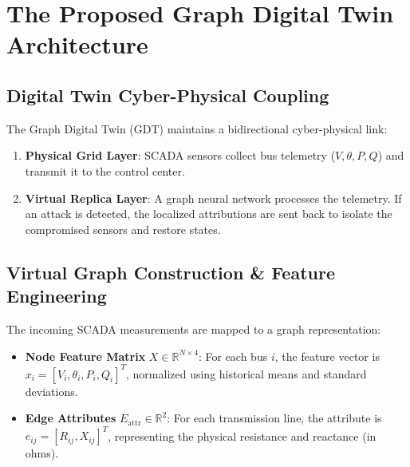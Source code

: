 \documentclass[conference]{IEEEtran}
\begin{document}
\section{The Proposed Graph Digital Twin Architecture}

\subsection{Digital Twin Cyber-Physical Coupling}
The Graph Digital Twin (GDT) maintains a bidirectional cyber-physical link:
\begin{enumerate}
    \item \textbf{Physical Grid Layer}: SCADA sensors collect bus telemetry ($V, \theta, P, Q$) and transmit it to the control center.
    \item \textbf{Virtual Replica Layer}: A graph neural network processes the telemetry. If an attack is detected, the localized attributions are sent back to isolate the compromised sensors and restore states.
\end{enumerate}

\subsection{Virtual Graph Construction & Feature Engineering}
The incoming SCADA measurements are mapped to a graph representation:
\begin{itemize}
    \item \textbf{Node Feature Matrix} $X \in \mathbb{R}^{N \times 4}$: For each bus $i$, the feature vector is $x_i = [V_i, \theta_i, P_i, Q_i]^T$, normalized using historical means and standard deviations.
    \item \textbf{Edge Attributes} $E_{\text{attr}} \in \mathbb{R}^{2}$: For each transmission line, the attribute is $e_{ij} = [R_{ij}, X_{ij}]^T$, representing the physical resistance and reactance (in ohms).
\end{itemize}
\end{document}
